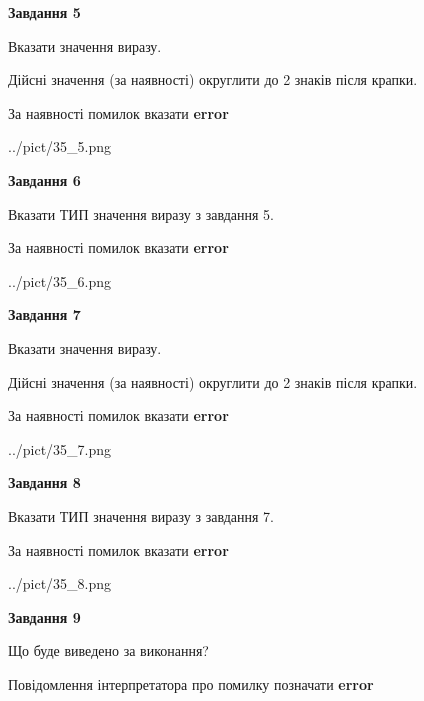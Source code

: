 \documentclass[11pt, ukrainian]{article}
\begin{document}
{\begin {large}
{\begin {center}\textbf{Завдання 5}\end {center}}\par
Вказати значення виразу. \par
Дійсні значення (за наявності) округлити до 2 знаків після крапки. \par
За наявності помилок вказати \textbf{error}

\begin{center}
	{../pict/35_5.png}
\end{center}
\newpage

{\begin {center}\textbf{Завдання 6}\end {center}}\par
Вказати ТИП значення виразу з завдання 5. \par
За наявності помилок вказати \textbf{error}

\begin{center}
	{../pict/35_6.png}
\end{center}
\newpage

{\begin {center}\textbf{Завдання 7}\end {center}}\par
Вказати значення виразу. \par
Дійсні значення (за наявності) округлити до 2 знаків після крапки. \par
За наявності помилок вказати \textbf{error}

\begin{center}
	{../pict/35_7.png}
\end{center}
\newpage

{\begin {center}\textbf{Завдання 8}\end {center}}\par
Вказати ТИП значення виразу з завдання 7. \par
За наявності помилок вказати \textbf{error}

\begin{center}
	{../pict/35_8.png}
\end{center}
\newpage

{\begin {center}\textbf{Завдання 9}\end {center}}\par
Що буде виведено за виконання? \par
Повідомлення інтерпретатора про помилку позначати \textbf{error}


\end{large}}
\end{document}
